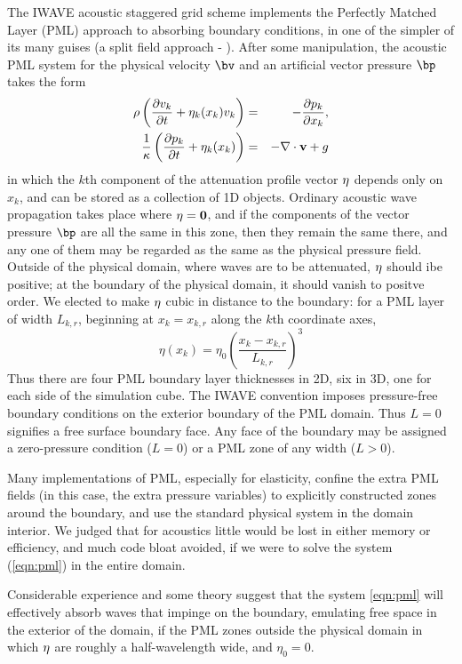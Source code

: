 The IWAVE acoustic staggered grid scheme implements the Perfectly
Matched Layer (PML) approach to absorbing boundary conditions, in one of the
simpler of its many guises (a split field approach -
\cite[]{Habashy:07}). After some manipulation, the acoustic PML system
for the physical velocity $\bv$ and an artificial vector pressure
$\bp$ takes the form
\begin{eqnarray}
\label{eqn:pml}
\rho \left(\frac{\partial v_k}{\partial t} + \eta_k(x_k)v_k\right) &=&
- \frac{\partial p_k}{\partial x_k}, \nonumber \\
\frac{1}{\kappa}\left(\frac{\partial p_k}{\partial t} + \eta_k(x_k)\right) &=& -\nabla \cdot {\bf v} + g
\end{eqnarray}
in which the $k$th component of the attenuation profile vector ${\bf \eta}$ depends
only on $x_k$, and can be stored as a collection of 1D objects. Ordinary acoustic
wave propagation takes place where ${\bf \eta}={\bf 0}$, and if the
components of the vector pressure $\bp$ are all the same in this zone,
then they remain the same there, and any one of them may be regarded
as the same as the physical pressure field. Outside of the physical
domain, where waves are to be attenuated, ${\bf {\eta}}$ should
ibe positive; at the boundary of the physical domain, it should vanish to positve order. We
elected to make ${\bf {\eta}}$ cubic in distance to the boundary: for
a PML layer of width $L_{k,r}$, beginning at $x_k=x_{k,r}$ along the $k$th
coordinate axes,
\[
\eta(x_k) = \eta_0 \left(\frac{x_k-x_{k,r}}{L_{k,r}}\right)^3
\]
Thus there are four PML boundary layer thicknesses in 2D, six in 3D, one
for each side of the simulation cube. The IWAVE convention imposes
pressure-free boundary conditions on the exterior boundary of the PML
domain. Thus $L=0$ signifies a free surface boundary face. Any face of
the boundary may be assigned a zero-pressure condition ($L=0$) or a
PML zone of any width ($L>0$).

Many implementations of PML, especially for elasticity, confine the
extra PML fields (in this case, the extra pressure variables) to
explicitly constructed zones around the boundary, and use the standard
physical system in the domain interior. We judged that for acoustics little would be
lost in either memory or efficiency, and much code bloat avoided, if
we were to solve the system (\ref{eqn:pml}) in the entire domain.

Considerable experience and some theory
\cite[]{Habashy:07,moczoetal:06} suggest that the system \ref{eqn:pml} will
effectively absorb waves that impinge on the boundary, emulating free
space in the exterior of the domain, if the PML zones outside the
physical domain in which ${\bf {\eta}}$ are roughly a half-wavelength
wide, and $\eta_0=0$.

